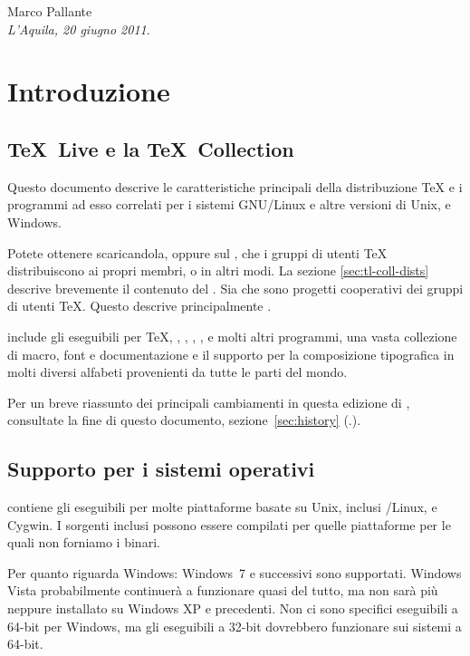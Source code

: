 \documentclass{article}
\begin{document}
\bigskip

\noindent Marco Pallante\\
\emph{L'Aquila, 20 giugno 2011}.


\section{Introduzione}
\label{sec:intro}

\subsection{\protect\TeX\protect\ Live e la \protect\TeX\protect\ Collection}

Questo documento descrive le caratteristiche principali della
distribuzione \TL{}\Dash \TeX{} e i programmi ad esso correlati per
i sistemi GNU/Linux e altre versioni di Unix, \MacOSX{} e Windows.

Potete ottenere \TL{} scaricandola, oppure sul \DVD{} \TK, che i gruppi di
utenti \TeX{} distribuiscono ai propri membri, o in altri modi. La sezione
\ref{sec:tl-coll-dists} descrive brevemente il contenuto del \DVD. Sia
\TL{} che \TK{} sono progetti cooperativi dei gruppi di utenti \TeX.
Questo descrive principalmente \TL.

\TL{} include gli eseguibili per \TeX, \LaTeXe, \ConTeXt, \MF, \MP,
\BibTeX{} e molti altri programmi, una vasta collezione di macro, font e
documentazione e il supporto per la composizione tipografica in molti
diversi alfabeti provenienti da tutte le parti del mondo.

Per un breve riassunto dei principali cambiamenti in questa edizione di
\TL, consultate la fine di questo documento, sezione~\ref{sec:history}
(\p.\pageref{sec:history}).



\subsection{Supporto per i sistemi operativi}
\label{sec:os-support}

\TL{} contiene gli eseguibili per molte piattaforme basate su Unix,
inclusi \GNU/Linux, \MacOSX{} e Cygwin. I sorgenti inclusi possono essere
compilati per quelle piattaforme per le quali non forniamo i binari.

Per quanto riguarda Windows: Windows~7 e successivi sono supportati.
Windows Vista probabilmente continuerà a funzionare quasi del
tutto, ma \TL{} non sarà più neppure installato su Windows XP e
precedenti. Non ci sono specifici eseguibili a 64-bit per Windows, ma gli
eseguibili a 32-bit dovrebbero funzionare sui sistemi a 64-bit.
\end{document}

